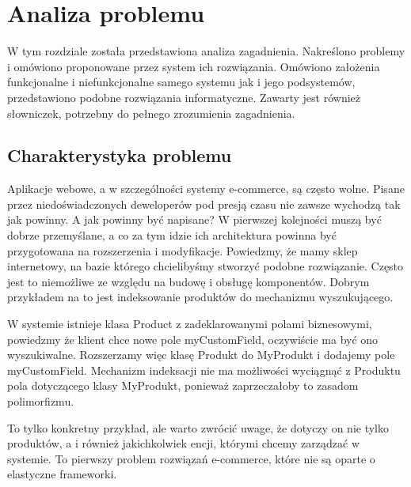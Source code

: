 \chapter{Analiza problemu}
\thispagestyle{chapterBeginStyle}
\label{rozdzial1}

W tym rozdziale została przedstawiona analiza zagadnienia. Nakreślono problemy i omówiono proponowane przez system ich rozwiązania. Omówiono założenia funkcjonalne i niefunkcjonalne samego systemu jak i jego podsystemów, przedstawiono podobne rozwiązania informatyczne. Zawarty jest również słowniczek, potrzebny do pełnego zrozumienia zagadnienia.


\section{Charakterystyka problemu}
Aplikacje webowe, a w szczególności systemy e-commerce, są często wolne. Pisane przez niedoświadczonych deweloperów pod presją czasu nie zawsze wychodzą tak jak powinny. A jak powinny być napisane? W pierwszej kolejności muszą być dobrze przemyślane, a co za tym idzie ich architektura powinna być przygotowana na rozszerzenia i modyfikacje. Powiedzmy, że mamy sklep internetowy, na bazie którego chcielibyśmy stworzyć podobne rozwiązanie. Często jest to niemożliwe ze względu na budowę i obsługę komponentów. Dobrym przykładem na to jest indeksowanie produktów do mechanizmu wyszukującego.
\begin{example}
	W systemie istnieje klasa Product z zadeklarowanymi polami biznesowymi, powiedzmy że klient chce nowe pole myCustomField, oczywiście ma być ono wyszukiwalne. Rozszerzamy więc klasę Produkt do MyProdukt i dodajemy pole myCustomField. Mechanizm indeksacji nie ma możliwości wyciągnąć z Produktu pola dotyczącego klasy MyProdukt, ponieważ zaprzeczałoby to zasadom polimorfizmu.
\end{example} 
To tylko konkretny przykład, ale warto zwrócić uwage, że dotyczy on nie tylko produktów, a i również jakichkolwiek encji, którymi chcemy zarządzać w systemie. To pierwszy problem rozwiązań e-commerce, które nie są oparte o elastyczne frameworki. 

